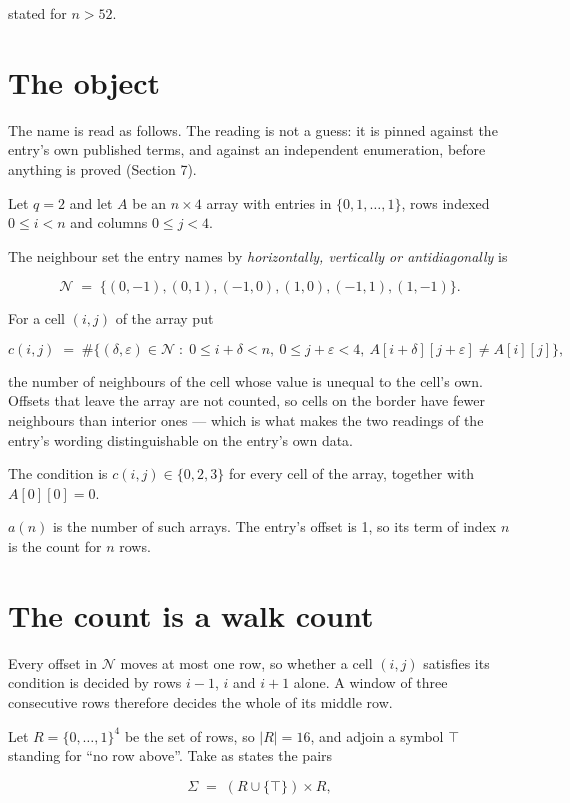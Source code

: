 \documentclass[11pt]{article}
\theoremstyle{definition}
\begin{document}
stated for $n > 52$.

\section{The object}

The name is read as follows. The reading is not a guess: it is pinned against the entry's own published terms, and against an independent enumeration, before anything is proved (Section 7).

Let $q = 2$ and let $A$ be an $n \times 4$ array with entries in $\{0,1,\dots,1\}$, rows indexed $0 \le i < n$ and columns $0 \le j < 4$.

The neighbour set the entry names by {\itshape horizontally, vertically or antidiagonally} is

\[\mathcal{N} \;=\; \{(0,-1), (0,1), (-1,0), (1,0), (-1,1), (1,-1)\}.\]

For a cell $(i,j)$ of the array put

\[c(i,j) \;=\; \#\bigl\{(\delta,\varepsilon)\in\mathcal{N} \;:\; 0\le i+\delta<n,\ 0\le j+\varepsilon<4,\ A[i+\delta][j+\varepsilon] \neq A[i][j]\bigr\},\]

the number of neighbours of the cell whose value is unequal to the cell's own. Offsets that leave the array are not counted, so cells on the border have fewer neighbours than interior ones --- which is what makes the two readings of the entry's wording distinguishable on the entry's own data.

The condition is $c(i,j) \in \{0, 2, 3\}$ for every cell of the array, together with $A[0][0]=0$.

$a(n)$ is the number of such arrays. The entry's offset is 1, so its term of index $n$ is the count for $n$ rows.

\section{The count is a walk count}

Every offset in $\mathcal{N}$ moves at most one row, so whether a cell $(i,j)$ satisfies its condition is decided by rows $i-1$, $i$ and $i+1$ alone. A window of three consecutive rows therefore decides the whole of its middle row.

Let $R = \{0,\dots,1\}^{4}$ be the set of rows, so $|R| = 16$, and adjoin a symbol $\top$ standing for ``no row above''. Take as states the pairs

\[\Sigma \;=\; (R \cup \{\top\}) \times R,\]
\end{document}
